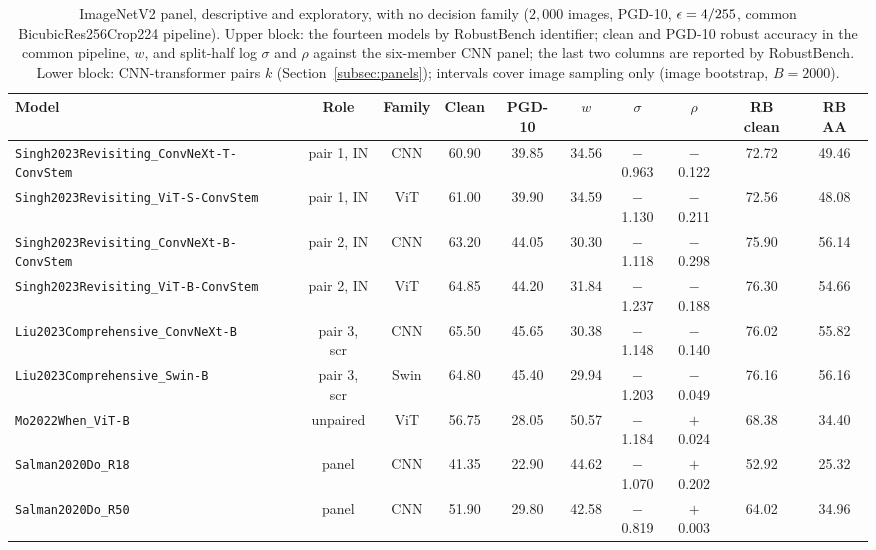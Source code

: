 \begin{table}[!t]
\centering
\caption{ImageNetV2 panel, descriptive and exploratory, with no decision family ($2{,}000$ images, PGD-10, $\epsilon = 4/255$, common BicubicRes256Crop224 pipeline). Upper block: the fourteen models by RobustBench identifier; clean and PGD-10 robust accuracy in the common pipeline, $w$, and split-half log $\sigma$ and $\rho$ against the six-member CNN panel; the last two columns are reported by RobustBench. Lower block: CNN-transformer pairs $k$ (Section~\ref{subsec:panels}); intervals cover image sampling only (image bootstrap, $B = 2000$).}
\label{tab:imagenet}
\scriptsize
\setlength{\tabcolsep}{2.5pt}
\begin{tabular*}{\textwidth}{@{\extracolsep{\fill}}lccccccccc}
\toprule
\textbf{Model} & \textbf{Role} & \textbf{Family} & \textbf{Clean} & \textbf{PGD-10} & \textbf{$w$} & \textbf{$\sigma$} & \textbf{$\rho$} & \textbf{RB clean} & \textbf{RB AA} \\
\midrule
\texttt{Singh2023Revisiting\_ConvNeXt-T-ConvStem} & pair 1, IN & CNN & 60.90 & 39.85 & 34.56 & $-$0.963 & $-$0.122 & 72.72 & 49.46 \\
\texttt{Singh2023Revisiting\_ViT-S-ConvStem} & pair 1, IN & ViT & 61.00 & 39.90 & 34.59 & $-$1.130 & $-$0.211 & 72.56 & 48.08 \\
\texttt{Singh2023Revisiting\_ConvNeXt-B-ConvStem} & pair 2, IN & CNN & 63.20 & 44.05 & 30.30 & $-$1.118 & $-$0.298 & 75.90 & 56.14 \\
\texttt{Singh2023Revisiting\_ViT-B-ConvStem} & pair 2, IN & ViT & 64.85 & 44.20 & 31.84 & $-$1.237 & $-$0.188 & 76.30 & 54.66 \\
\texttt{Liu2023Comprehensive\_ConvNeXt-B} & pair 3, scr & CNN & 65.50 & 45.65 & 30.38 & $-$1.148 & $-$0.140 & 76.02 & 55.82 \\
\texttt{Liu2023Comprehensive\_Swin-B} & pair 3, scr & Swin & 64.80 & 45.40 & 29.94 & $-$1.203 & $-$0.049 & 76.16 & 56.16 \\
\texttt{Mo2022When\_ViT-B} & unpaired & ViT & 56.75 & 28.05 & 50.57 & $-$1.184 & $+$0.024 & 68.38 & 34.40 \\
\texttt{Salman2020Do\_R18} & panel & CNN & 41.35 & 22.90 & 44.62 & $-$1.070 & $+$0.202 & 52.92 & 25.32 \\
\texttt{Salman2020Do\_R50} & panel & CNN & 51.90 & 29.80 & 42.58 & $-$0.819 & $+$0.003 & 64.02 & 34.96 \\

\end{tabular*}
\end{table}
